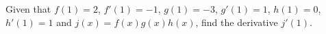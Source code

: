 Given that  $f(1)=2$, $f'(1)=-1$, $g(1)=-3$, $g'(1)=1$, $h(1)=0$, $h'(1)=1$ and  $j(x)=f(x)g(x)h(x)$, find the derivative $j'(1)$.

